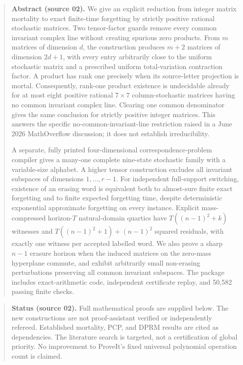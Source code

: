 \documentclass[11pt,letterpaper]{article}
\theoremstyle{definition}
\theoremstyle{remark}
\begin{document}
\begin{quote}\small
\textbf{Abstract (source 02).} We give an explicit reduction from integer matrix mortality to exact finite-time
forgetting by strictly positive rational stochastic matrices. Two tensor-factor
guards remove every common invariant complex line without creating spurious
zero products. From $m$ matrices of dimension $d$, the construction produces
$m+2$ matrices of dimension $2d+1$, with every entry arbitrarily close to the
uniform stochastic matrix and a prescribed uniform total-variation contraction
factor. A product has rank one precisely when its source-letter projection is
mortal. Consequently, rank-one product existence is undecidable already for at
most eight positive rational $7\times7$ column-stochastic matrices having no
common invariant complex line. Clearing one common denominator gives the same
conclusion for strictly positive integer matrices. This answers the specific
no-common-invariant-line restriction raised in a June 2026 MathOverflow discussion;
it does not establish irreducibility.

A separate, fully printed four-dimensional correspondence-problem compiler gives
a many-one complete nine-state stochastic family with a variable-size alphabet.
A higher tensor construction excludes all invariant subspaces of dimensions
$1,\ldots,r-1$. For independent full-support switching, existence of an erasing
word is equivalent both to almost-sure finite exact forgetting and to finite
expected forgetting time, despite deterministic exponential approximate
forgetting on every instance. Explicit mass-compressed horizon-$T$ natural-domain quartics have
$T((n-1)^2+k)$ witnesses and $T((n-1)^2+1)+(n-1)^2$ squared residuals, with
exactly one witness per accepted labelled word. We also prove a sharp $n-1$ erasure horizon
when the induced matrices on the zero-mass hyperplane commute, and exhibit
arbitrarily small non-erasing perturbations preserving all common invariant
subspaces. The package includes exact-arithmetic code, independent certificate
replay, and 50,582 passing finite checks.
\end{quote}
\begin{quote}\small
\textbf{Status (source 02).} Full mathematical proofs are supplied below. The new constructions
are not proof-assistant verified or independently refereed. Established mortality,
PCP, and DPRM results are cited as dependencies. The literature search is targeted,
not a certification of global priority. No improvement to ProveIt's fixed universal
polynomial operation count is claimed.
\end{quote}
\end{document}
